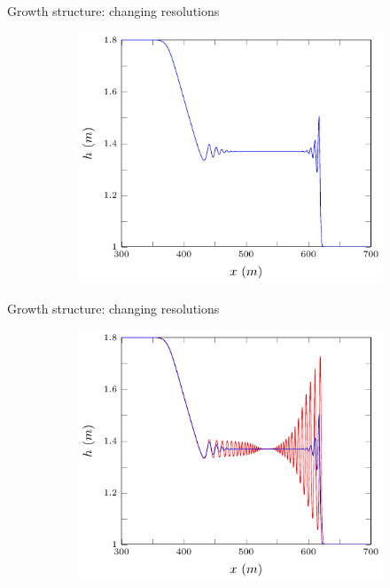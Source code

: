\documentclass[pdf]{beamer}
\begin{document}
\begin{frame}{Growth structure: changing resolutions}
		\begin{figure}
			\begin{subfigure}{0.75\textwidth}
				\includegraphics[width=\textwidth]{../Pics/dx0/4/1-figure0.pdf}
			\end{subfigure}
		\end{figure}
\end{frame}

\begin{frame}{Growth structure: changing resolutions}
	\begin{figure}
		\begin{subfigure}{0.75\textwidth}
			\includegraphics[width=\textwidth]{../Pics/dx0/46/1-figure0.pdf}
		\end{subfigure}
	\end{figure}
\end{frame}
\end{document}
